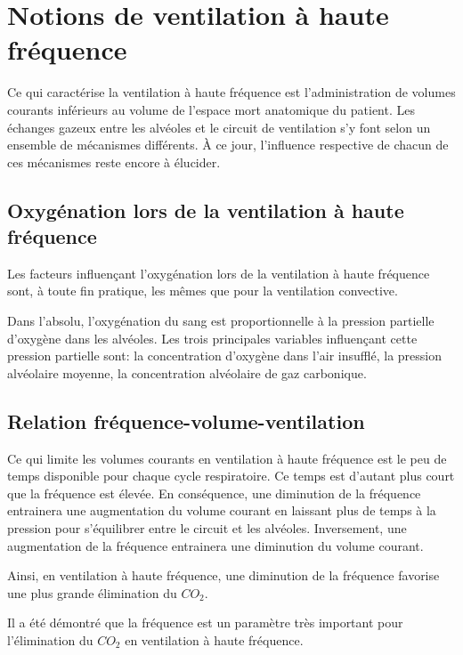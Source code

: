 \section{Notions de ventilation à haute fréquence}

Ce qui caractérise la ventilation à haute fréquence est l'administration de
volumes courants inférieurs au volume de l'espace mort anatomique du patient.
Les échanges gazeux entre les alvéoles et le circuit de ventilation s'y font
selon un ensemble de mécanismes différents. À ce jour, l'influence respective
de chacun de ces mécanismes reste encore à élucider\cite{Pillow2005}.

\subsection{Oxygénation lors de la ventilation à haute fréquence}

Les facteurs influençant l'oxygénation lors de la ventilation à haute fréquence
sont, à toute fin pratique, les mêmes que pour la ventilation convective.

Dans l'absolu, l'oxygénation du sang est proportionnelle à la pression
partielle d'oxygène dans les alvéoles. Les trois principales variables
influençant cette pression partielle sont: la concentration d'oxygène dans
l'air insufflé, la pression alvéolaire moyenne, la concentration alvéolaire de
gaz carbonique.

\subsection{Relation fréquence-volume-ventilation}

Ce qui limite les volumes courants en ventilation à haute fréquence est le peu
de temps disponible pour chaque cycle respiratoire. Ce temps est d'autant plus
court que la fréquence est élevée. 
En conséquence, une diminution de la fréquence entrainera une augmentation du
volume courant en laissant plus de temps à la pression pour s'équilibrer entre
le circuit et les alvéoles. Inversement, une augmentation de la fréquence
entrainera une diminution du volume courant.

Ainsi, en ventilation à haute fréquence, une diminution de la fréquence
favorise une plus grande élimination du $CO_2$.

Il a été démontré que la fréquence est un paramètre très important pour
l'élimination du $CO_2$ en ventilation à haute fréquence\cite{Pillow2005}.

